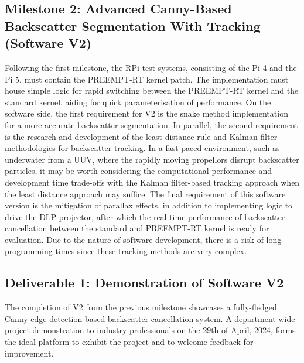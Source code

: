 \subsection{Milestone 2: Advanced Canny-Based Backscatter Segmentation With Tracking (Software V2)}
Following the first milestone, the RPi test systems, consisting of the Pi 4 and the Pi 5, must contain the PREEMPT-RT kernel patch. The implementation must house simple logic for rapid switching between the PREEMPT-RT kernel and the standard kernel, aiding for quick parameterisation of performance. On the software side, the first requirement for V2 is the snake method implementation for a more accurate backscatter segmentation. In parallel, the second requirement is the research and development of the least distance rule and Kalman filter methodologies for backscatter tracking. In a fast-paced environment, such as underwater from a UUV, where the rapidly moving propellors disrupt backscatter particles, it may be worth considering the computational performance and development time trade-offs with the Kalman filter-based tracking approach when the least distance approach may suffice. The final requirement of this software version is the mitigation of parallax effects, in addition to implementing logic to drive the DLP projector, after which the real-time performance of backscatter cancellation between the standard and PREEMPT-RT kernel is ready for evaluation. Due to the nature of software development, there is a risk of long programming times since these tracking methods are very complex.

\subsection{Deliverable 1: Demonstration of Software V2}
The completion of V2 from the previous milestone showcases a fully-fledged Canny edge detection-based backscatter cancellation system. A department-wide project demonstration to industry professionals on the 29th of April, 2024, forms the ideal platform to exhibit the project and to welcome feedback for improvement.

